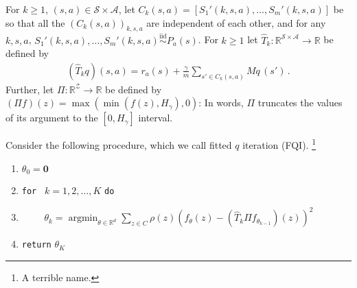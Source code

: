 \documentclass{article}
\newcommand{\R}{\mathbb{R}}
\newcommand{\cZ}{\mathcal{Z}}
\DeclareMathOperator*{\argmin}{argmin}
\DeclareMathOperator*{\1}{\mathbbm{1}}
\newcommand{\0}{\mathbf{0}}
\theoremstyle{definition}
\theoremstyle{remark}
\newcommand{\cS}{\mathcal{S}}
\newcommand{\cA}{\mathcal{A}}
\begin{document}
For $k\ge 1$, $(s,a)\in \cS \times \cA$, let $C_k(s,a) = [S_1'(k,s,a),\dots,S_m'(k,s,a)]$ be so that all the $(C_k(s,a))_{k,s,a}$ are independent of each other, and for any $k,s,a$, $S_1'(k,s,a),\dots,S_m'(k,s,a) \stackrel{\textrm{iid}}{\sim} P_a(s)$.
For $k\ge 1$ let $\hat T_k: \R^{\cS\times \cA} \to \R$ be defined by
\begin{align*}
(\hat T_k q)(s,a) = r_a(s) + \frac{\gamma}{m} \sum_{s'\in C_k(s,a)} Mq \, (s')\,.
\end{align*}
Further, let $\Pi: \R^{\cZ} \to \R$ be defined by $(\Pi f)(z) = \max(\min(f(z),H_\gamma),0)$: In words, $\Pi$ truncates the values of its argument to the $[0,H_\gamma]$ interval.

Consider the following procedure, which we call fitted $q$ iteration (FQI).%
\footnote{A terrible name.}
\begin{enumerate}
\item $\theta_0 = \0$
\item {\tt for } $k=1,2,\dots,K$ {\tt do}
\item $\qquad$ $\theta_k = \argmin_{\theta\in \R^d} \sum_{z\in C} \rho(z) (f_\theta(z)-(\hat T_k \Pi f_{\theta_{k-1}})(z))^2$
\item {\tt return} $\theta_K$
\end{enumerate}
\end{document}
